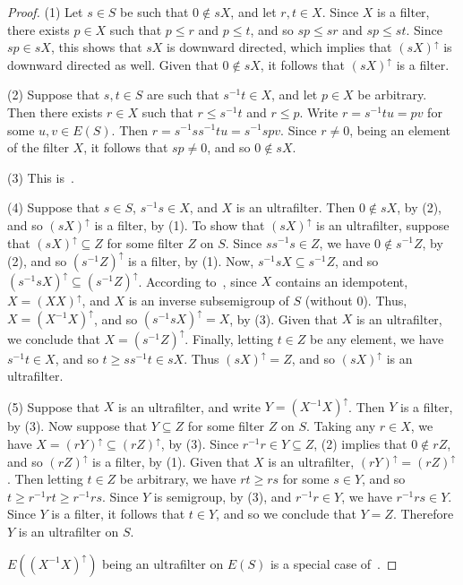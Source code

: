 \documentclass[a4paper,reqno,12pt]{amsart}
\numberwithin{equation}{section}
\theoremstyle{plain}
\theoremstyle{definition}
\begin{document}
\begin{proof}
(1) Let $s \in S$ be such that $0 \notin sX$, and let $r,t \in X$. Since $X$ is a filter, there exists $p \in X$ such that $p \leq r$ and $p \leq t$, and so $sp \leq sr$ and $sp \leq st$. Since $sp \in sX$, this shows that $sX$ is downward directed, which implies that $(sX)^{\uparrow}$ is downward directed as well. Given that $0 \notin sX$, it follows that $(sX)^{\uparrow}$ is a filter.

\smallskip

(2) Suppose that $s,t \in S$ are such that $s^{-1}t \in X$, and let $p \in X$ be arbitrary. Then there exists $r \in X$ such that $r \leq s^{-1}t$ and $r \leq p$. Write $r = s^{-1}tu = pv$ for some $u, v \in E(S)$. Then $r = s^{-1}ss^{-1}tu = s^{-1}spv$. Since $r \neq 0$, being an element of the filter $X$, it follows that $sp \neq 0$, and so $0 \notin sX$.

\smallskip

(3) This is~\cite[Lemma 2.8(1)]{Lawson3}.

\smallskip

(4) Suppose that $s \in S$, $s^{-1}s \in X$, and $X$ is an ultrafilter. Then $0 \notin sX$, by (2), and so $(sX)^{\uparrow}$ is a filter, by (1). To show that $(sX)^{\uparrow}$ is an ultrafilter, suppose that $(sX)^{\uparrow} \subseteq Z$ for some filter $Z$ on $S$. Since $ss^{-1}s \in Z$, we have $0 \notin s^{-1}Z$, by (2), and so $(s^{-1}Z)^{\uparrow}$ is a filter, by (1). Now, $s^{-1}sX \subseteq s^{-1}Z$, and so $(s^{-1}sX)^{\uparrow} \subseteq (s^{-1}Z)^{\uparrow}$. According to~\cite[Lemma 2.8(2)]{Lawson3}, since $X$ contains an idempotent, $X = (XX)^{\uparrow}$, and $X$ is an inverse subsemigroup of $S$ (without $0$). Thus, $X = (X^{-1}X)^{\uparrow}$, and so $(s^{-1}sX)^{\uparrow} = X$, by (3). Given that $X$ is an ultrafilter, we conclude that $X = (s^{-1}Z)^{\uparrow}$. Finally, letting $t \in Z$ be any element, we have $s^{-1}t \in X$, and so $t \geq ss^{-1}t \in sX$. Thus $(sX)^{\uparrow} = Z$, and so $(sX)^{\uparrow}$ is an ultrafilter.

\smallskip

(5) Suppose that $X$ is an ultrafilter, and write $Y = (X^{-1} X)^{\uparrow}$. Then $Y$ is a filter, by (3). Now suppose that $Y \subseteq Z$ for some filter $Z$ on $S$. Taking any $r \in X$, we have $X = (rY)^{\uparrow} \subseteq (rZ)^{\uparrow}$, by (3). Since $r^{-1}r \in Y \subseteq Z$, (2) implies that $0 \notin rZ$, and so $(rZ)^{\uparrow}$ is a filter, by (1). Given that $X$ is an ultrafilter, $(rY)^{\uparrow} = (rZ)^{\uparrow}$. Then letting $t \in Z$ be arbitrary, we have $rt \geq rs$ for some $s \in Y$, and so $t \geq r^{-1}rt \geq r^{-1}rs$. Since $Y$ is semigroup, by (3), and $r^{-1}r \in Y$, we have $r^{-1}rs \in Y$. Since $Y$ is a filter, it follows that $t \in Y$, and so we conclude that $Y=Z$. Therefore $Y$ is an ultrafilter on $S$.

$E((X^{-1} X)^{\uparrow})$ being an ultrafilter on $E(S)$ is a special case of~\cite[Lemma 2.18(3)]{Lawson3}. 
\end{proof}
\end{document}
